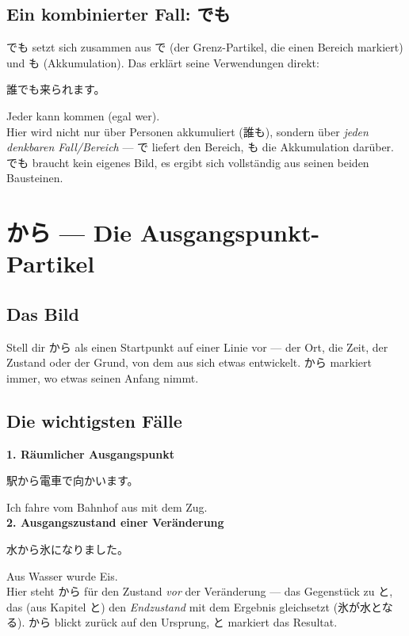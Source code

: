 \documentclass[12pt]{book}
\begin{document}
\section*{Ein kombinierter Fall: でも}

でも setzt sich zusammen aus で (der Grenz-Partikel, die einen Bereich markiert) und も (Akkumulation). Das erklärt seine Verwendungen direkt:

\par\quad 誰でも来られます。\\
\par\quad Jeder kann kommen (egal wer).\\

Hier wird nicht nur über Personen akkumuliert (誰も), sondern über \emph{jeden denkbaren Fall/Bereich} — で liefert den Bereich, も die Akkumulation darüber. でも braucht kein eigenes Bild, es ergibt sich vollständig aus seinen beiden Bausteinen.


\chapter{から — Die Ausgangspunkt-Partikel}

\section*{Das Bild}

Stell dir から als einen Startpunkt auf einer Linie vor — der Ort, die Zeit, der Zustand oder der Grund, von dem aus sich etwas entwickelt. から markiert immer, wo etwas seinen Anfang nimmt.

\section*{Die wichtigsten Fälle}

\textbf{1. Räumlicher Ausgangspunkt}
\par\quad 駅から電車で向かいます。\\
\par\quad Ich fahre vom Bahnhof aus mit dem Zug.\\

\textbf{2. Ausgangszustand einer Veränderung}
\par\quad 水から氷になりました。\\
\par\quad Aus Wasser wurde Eis.\\

Hier steht から für den Zustand \emph{vor} der Veränderung — das Gegenstück zu と, das (aus Kapitel と) den \emph{Endzustand} mit dem Ergebnis gleichsetzt (氷が水となる). から blickt zurück auf den Ursprung, と markiert das Resultat.
\end{document}
